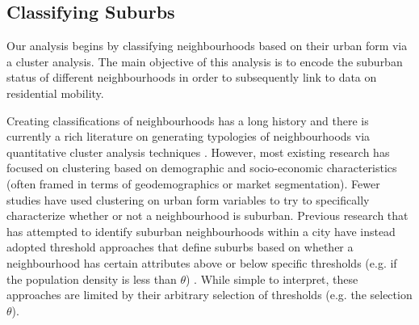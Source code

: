 


\subsection{Classifying Suburbs}

Our analysis begins by classifying neighbourhoods based on their urban form via a cluster analysis. The main objective of this analysis is to encode the suburban status of different neighbourhoods in order to subsequently link to data on residential mobility.

Creating classifications of neighbourhoods has a long history \cite{booth_life_1902,shevky_social_1955} and there is currently a rich literature on generating typologies of neighbourhoods via quantitative cluster analysis techniques  \cite{delmelle_differentiating_2017,silver_markov_2021}. However, most existing research has focused on clustering based on demographic and socio-economic characteristics (often framed in terms of geodemographics or market segmentation). Fewer studies have used clustering on urban form variables to try to specifically characterize whether or not a neighbourhood is suburban. Previous research that has attempted to identify suburban neighbourhoods within a city have instead adopted threshold approaches that define suburbs based on whether a neighbourhood has certain attributes above or below specific thresholds (e.g. if the population density is less than $\theta$) \cite{moos_suburban_2015,airgood-obrycki_suburban_2019}. While simple to interpret, these approaches are limited by their arbitrary selection of thresholds (e.g. the selection $\theta$). 


